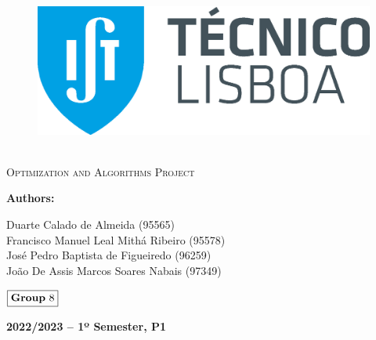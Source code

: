 \documentclass[12pt]{article}
\begin{document}
\begin{center}
    \begin{figure}
        \vspace{-1.0cm}
        \includegraphics[scale = 0.3, left]{Images/IST_A.eps} %
    \end{figure}
    \mbox{}\\[2.0cm]
    \textsc{\Huge Optimization and Algorithms Project}\\[2.5cm]
\end{center}

\begin{flushleft}
    \textbf{Authors:}
\end{flushleft}

\begin{center}
    \begin{minipage}{0.5\textwidth}
        \begin{flushleft}
            Duarte Calado de Almeida (95565)\\
            Francisco Manuel Leal Mithá Ribeiro (95578)\\
            José Pedro Baptista de Figueiredo (96259) \\
            João De Assis Marcos Soares Nabais (97349)\\ 
        \end{flushleft}
    \end{minipage}%
\end{center}
    
\begin{flushleft}
    \large $\boxed{\text{\bf Group} \ 8}$\\[4.0cm]
\end{flushleft}
    
\begin{center}
    \large \bf 2022/2023 -- 1º Semester, P1
\end{center}
\end{document}
